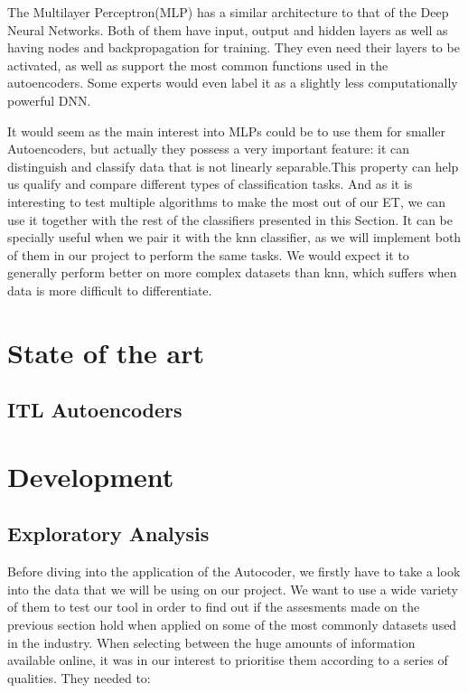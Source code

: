 \documentclass[12pt]{report}
\begin{document}
The Multilayer Perceptron(MLP) has a similar architecture to that of the Deep Neural Networks. Both of them have input, output and hidden layers as well as having nodes and backpropagation for training. They even need their layers to be activated, as well as support the most common functions used in the autoencoders. Some experts would even label it as a slightly less computationally powerful DNN. \par

It would seem as the main interest into MLPs could be to use them for smaller Autoencoders, but actually they possess a very important feature: it can distinguish and classify data that is not linearly separable.This property can help us qualify and compare different types of classification tasks. And as it is interesting to test multiple algorithms to make the most out of our ET, we can use it together with the rest of the classifiers presented in this Section. It can be specially useful when we pair it with the knn classifier, as we will implement both of them in our project to perform the same tasks. We would expect it to generally perform better on more complex datasets than knn, which suffers when data is more difficult to differentiate. \par
\chapter{State of the art}
\section{ITL Autoencoders}




\chapter{Development}
\section{Exploratory Analysis}

Before diving into the application of the Autocoder, we firstly have to take a look into the data that we will be using on our project. We want to use a wide variety of them to test our tool in order to find out if the assesments made on the previous section hold when applied on some of the most commonly datasets used in the industry. When selecting between the huge amounts of information available online, it was in our interest to prioritise them according to a series of qualities. They needed to:
 
\end{document}
